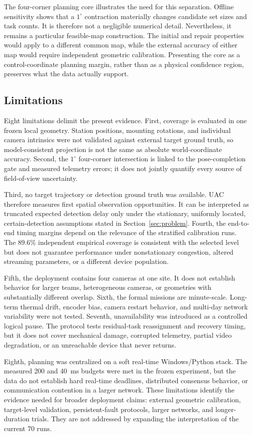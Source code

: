 The four-corner planning core illustrates the need for this separation. Offline sensitivity shows that a $1^\circ$ contraction materially changes candidate set sizes and task counts. It is therefore not a negligible numerical detail. Nevertheless, it remains a particular feasible-map construction. The initial and repair properties would apply to a different common map, while the external accuracy of either map would require independent geometric calibration. Presenting the core as a control-coordinate planning margin, rather than as a physical confidence region, preserves what the data actually support.

\subsection{Limitations}

Eight limitations delimit the present evidence. First, coverage is evaluated in one frozen local geometry. Station positions, mounting rotations, and individual camera intrinsics were not validated against external target ground truth, so model-consistent projection is not the same as absolute world-coordinate accuracy. Second, the $1^\circ$ four-corner intersection is linked to the pose-completion gate and measured telemetry errors; it does not jointly quantify every source of field-of-view uncertainty.

Third, no target trajectory or detection ground truth was available. UAC therefore measures first spatial observation opportunities. It can be interpreted as truncated expected detection delay only under the stationary, uniformly located, certain-detection assumptions stated in Section~\ref{sec:problem}. Fourth, the end-to-end timing margins depend on the relevance of the stratified calibration runs. The 89.6\% independent empirical coverage is consistent with the selected level but does not guarantee performance under nonstationary congestion, altered streaming parameters, or a different device population.

Fifth, the deployment contains four cameras at one site. It does not establish behavior for larger teams, heterogeneous cameras, or geometries with substantially different overlap. Sixth, the formal missions are minute-scale. Long-term thermal drift, encoder bias, camera restart behavior, and multi-day network variability were not tested. Seventh, unavailability was introduced as a controlled logical pause. The protocol tests residual-task reassignment and recovery timing, but it does not cover mechanical damage, corrupted telemetry, partial video degradation, or an unreachable device that never returns.

Eighth, planning was centralized on a soft real-time Windows/Python stack. The measured 200 and 40~ms budgets were met in the frozen experiment, but the data do not establish hard real-time deadlines, distributed consensus behavior, or communication contention in a larger network. These limitations identify the evidence needed for broader deployment claims: external geometric calibration, target-level validation, persistent-fault protocols, larger networks, and longer-duration trials. They are not addressed by expanding the interpretation of the current 70 runs.


